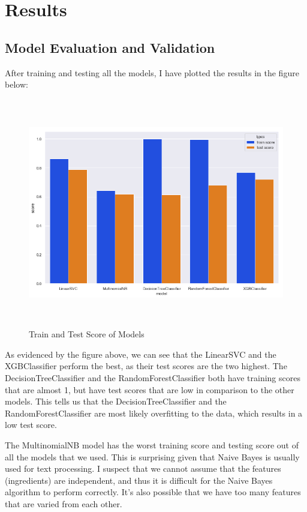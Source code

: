 \documentclass[12pt]{article}
\begin{document}
\section{Results}
\subsection{Model Evaluation and Validation}
After training and testing all the models, I have plotted the results in the figure below:

\begin{figure}[!h]
\includegraphics[width=\textwidth, height=10cm]{results.png}
\caption{Train and Test Score of Models}
\label{fig: model-results}
\end{figure}

\noindent
As evidenced by the figure above, we can see that the LinearSVC and the XGBClassifier perform the best, as their test scores are the two highest. The DecisionTreeClassifier and the RandomForestClassifier both have training scores that are almost 1, but have test scores that are low in comparison to the other models. This tells us that the DecisionTreeClassifier and the RandomForestClassifier are most likely overfitting to the data, which results in a low test score.

The MultinomialNB model has the worst training score and testing score out of all the models that we used. This is surprising given that Naive Bayes is usually used for  text processing. I suspect that we cannot assume that the features (ingredients) are independent, and thus it is difficult for the Naive Bayes algorithm to perform correctly. It's also possible that we have too many features that are varied from each other.
\end{document}
